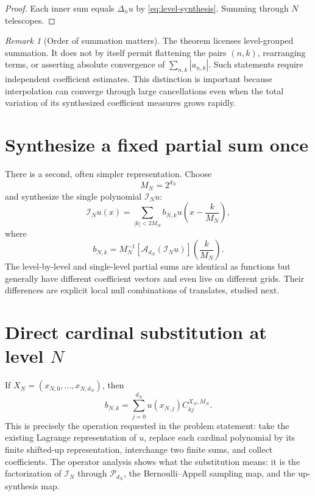 \documentclass[11pt,oneside]{book}
\theoremstyle{definition}
\theoremstyle{remark}
\newtheorem{remark}[theorem]{Remark}
\newcommand{\Pp}{\mathcal P}
\newcommand{\Iop}{\mathcal I}
\newcommand{\Aop}{\mathcal A}
\begin{document}
\begin{proof}
Each inner sum equals \(\Delta_nu\) by \cref{eq:level-synthesis}.  Summing through \(N\) telescopes.
\end{proof}

\begin{remark}[Order of summation matters]
The theorem licenses level-grouped summation.  It does not by itself permit flattening the pairs \((n,k)\), rearranging terms, or asserting absolute convergence of
\(\sum_{n,k}|a_{n,k}|\).  Such statements require independent coefficient estimates.  This distinction is important because interpolation can converge through large cancellations even when the total variation of its synthesized coefficient measures grows rapidly.
\end{remark}

\section{Synthesize a fixed partial sum once}
There is a second, often simpler representation.  Choose
\begin{equation}
 M_N=2^{d_N}
 \label{eq:MN}
\end{equation}
and synthesize the single polynomial \(\Iop_Nu\):
\begin{equation}
 \Iop_Nu(x)=\sum_{|k|<2M_N}b_{N,k}
 u\!\left(x-\frac{k}{M_N}\right),
 \label{eq:fixed-level-self-representation}
\end{equation}
where
\begin{equation}
 b_{N,k}=M_N^{-1}
 \left[\Aop_{d_N}(\Iop_Nu)\right]\!\left(\frac{k}{M_N}\right).
 \label{eq:fixed-level-b}
\end{equation}
The level-by-level and single-level partial sums are identical as functions but generally have different coefficient vectors and even live on different grids.  Their differences are explicit local null combinations of translates, studied next.

\section{Direct cardinal substitution at level \(N\)}
If \(X_N=(x_{N,0},\ldots,x_{N,d_N})\), then
\begin{equation}
 b_{N,k}=\sum_{j=0}^{d_N}u(x_{N,j})C_{kj}^{X_N,M_N}.
 \label{eq:b-cardinal-sum}
\end{equation}
This is precisely the operation requested in the problem statement: take the existing Lagrange representation of \(u\), replace each cardinal polynomial by its finite shifted-up representation, interchange two finite sums, and collect coefficients.  The operator analysis shows what the substitution means: it is the factorization of \(\Iop_N\) through \(\Pp_{d_N}\), the Bernoulli--Appell sampling map, and the up-synthesis map.
\end{document}
